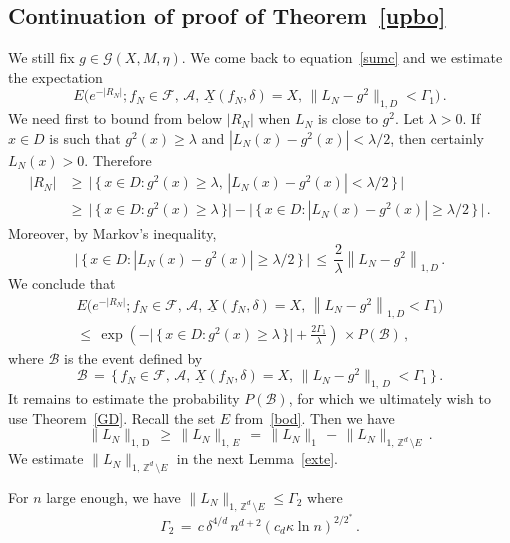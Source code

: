 \documentclass[AHL, Unicode, longabstracts, published]{cedram}
\newcommand{\XX}{{\underline{X}}}
\newcommand*\tD{\mathrm{D}}%
\newcommand*\Zd {{\mathbb Z^d}}
\newcommand{\cA}{\mathcal{A}}
\newcommand{\cB}{\mathcal{B}}
\newcommand{\cF}{\mathcal{F}}
\newcommand{\cG}{\mathcal{G}}
\begin{document}
\subsection{Continuation of proof of Theorem~\ref{upbo}}\label{contin}
We still fix ${g\in \cG(X,M,\eta)}$. We come back to equation~\eqref{sumc} and we estimate the expectation
\[
E\big(e^{-|R_N|};f_N\in\cF,\,\cA,\,\XX(f_N,\delta)=X,
\,\|L_N-g^2\|_{1,D}<\Gamma_1\big)\,.
\]
We need first to bound from below $|R_N|$ when $L_N$ is close to $g^2$. Let $\lambda>0$. If $x\in D$ is such that $g^2(x)\geq\lambda$ and $|L_N(x)-g^2(x)|<\lambda/2$, then certainly $L_N(x)>0$. Therefore
\begin{equation}
\begin{aligned}
|R_N| &\geq\,\big|\,\big\{\,x\in D:g^2(x)\geq\lambda,\, \left|L_N(x)-g^2(x)\right|<\lambda/2\,\big\}\,\big|\\
&\geq\,
\big|\,\big\{\,x\in D:g^2(x)\geq\lambda\,\big\}\big|-
\big|\,\big\{\,x\in D: \left|L_N(x)-g^2(x)\right|\geq\lambda/2\,\big\}\,\big|\,. \label{RNtriv}
\end{aligned}
\end{equation}
Moreover, by Markov's inequality,
\[
\big|\,\big\{\,x\in D:
\left|L_N(x)-g^2(x)\right|\geq\lambda/2\,\big\}\,\big|\,\leq\,
\frac{2}{\lambda}\left\|L_N-g^2\right\|_{1,D}\,.
\]
We conclude that
\begin{multline}\label{imc}
E\big(e^{-|R_N|};f_N\in\cF,\,\cA,\,\XX(f_N,\delta)=X,
\,\left\|L_N-g^2\right\|_{1,D}<\Gamma_1\big)
\\
\leq\,\exp\left(-
\big|\,\big\{\,x\in D:g^2(x)\geq\lambda\,\big\}\big| +\frac{2\Gamma_1}{\lambda}
\right)\,\times P(\cB)\,,
\end{multline}
where $\cB$ is the event defined by
\begin{equation}\label{E:cB}
\cB\,=\,\Big\{\, f_N\in\cF,\,\cA,\,\XX(f_N,\delta)=X,
\,\|L_N-g^2\|_{1,\,D}<\Gamma_1\,\Big\}
\,.
\end{equation}
It remains to estimate the probability $P(\cB)$, for which we ultimately wish to use Theorem~\ref{GD}. Recall the set $E$ from~\eqref{bod}. Then we have
\begin{equation}\label{prel}
\|L_N\|_{1,\,\tD}\,\geq\, \|L_N\|_{1,\,E}\,=\, \|L_N\|_{1}\,-\, \|L_N\|_{1,\,\Zd\,\setminus E}\,.
\end{equation}
We estimate $\|L_N\|_{1,\,\Zd\,\setminus E}$ in the next Lemma~\ref{exte}.
\begin{lemma}\label{exte}
For $n$ large enough, we have $\|L_N\|_{1,\,\Zd\,\setminus E}\leq\Gamma_2$ where
\begin{equation*}
\Gamma_2
\,=\,c\,\delta^{4/d}\, n^{d+2} (c_d{\kappa}\ln n)^{2/2^*}\,.
\end{equation*}
\end{lemma}
\end{document}
